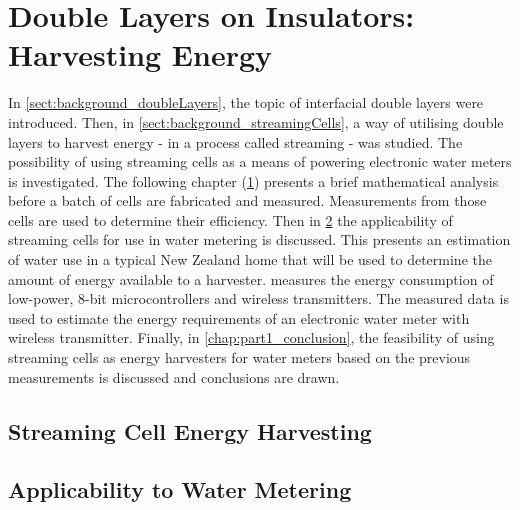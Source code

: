 

\part{Double Layers on Insulators: Harvesting Energy}
   \label{part:doubleLayersOnInsulators}

   In \cref{sect:background_doubleLayers}, the topic of interfacial double layers were introduced.
   Then, in \cref{sect:background_streamingCells}, a way of utilising double layers to harvest energy - in a process called streaming - was studied.
   The possibility of using streaming cells as a means of powering electronic water meters is investigated.
   The following chapter (\cref{chap:part1_streamingCellHarvesters}) presents a brief mathematical analysis before a batch of cells are fabricated and measured.
   Measurements from those cells are used to determine their efficiency.
   Then in \cref{chap:part1_waterMetering} the applicability of streaming cells for use in water metering is discussed.
   This presents an estimation of water use in a typical New Zealand home that will be used to determine the amount of energy available to a harvester.
    measures the energy consumption of low-power, 8-bit microcontrollers and wireless transmitters.
   The measured data is used to estimate the energy requirements of an electronic water meter with wireless transmitter.
   Finally, in \cref{chap:part1_conclusion}, the feasibility of using streaming cells as energy harvesters for water meters based on the previous measurements is discussed and conclusions are drawn.

   \chapter{Streaming Cell Energy Harvesting}
     \label{chap:part1_streamingCellHarvesters}
     


   \chapter{Applicability to Water Metering}
     \label{chap:part1_waterMetering}
     

